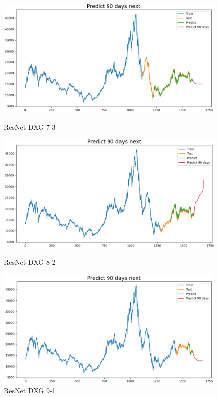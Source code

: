 \documentclass[conference]{IEEEtran}
\begin{document}
\begin{figure}[htbp]
    \vspace{0.5cm} %

    \begin{minipage}{0.23\textwidth}
    \centering
    \includegraphics[width=1\textwidth]{experiment/resnet/DXG 7_3.png}
    \caption{ResNet DXG 7-3}
    \label{fig:nvl_boxplot}
    \end{minipage}
    \hfill
    \begin{minipage}{0.23\textwidth}
    \centering
    \includegraphics[width=1\textwidth]{experiment/resnet/DXG 8_2.png}
    \caption{ResNet DXG 8-2}
    \label{fig:nvl_histogram}
    \end{minipage}
    \begin{minipage}{0.23\textwidth}
    \centering
    \includegraphics[width=1\textwidth]{experiment/resnet/DXG 9_1.png}
    \caption{ResNet DXG 9-1}
    \label{fig:nvl_histogram}
    \end{minipage}


\end{figure}
\end{document}
